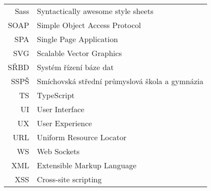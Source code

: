 \begin{longtable}{rl}
Sass & Syntactically awesome style sheets\\
SOAP & Simple Object Access Protocol\\
SPA & Single Page Application\\
SVG & Scalable Vector Graphics\\
SŘBD & Systém řízení báze dat\\
SSPŠ & Smíchovská střední průmyslová škola a gymnázia\\
TS & TypeScript\\
UI & User Interface\\
UX & User Experience\\
URL & Uniform Resource Locator\\
WS & Web Sockets\\
XML & Extensible Markup Language\\
XSS & Cross-site scripting
\end{longtable}